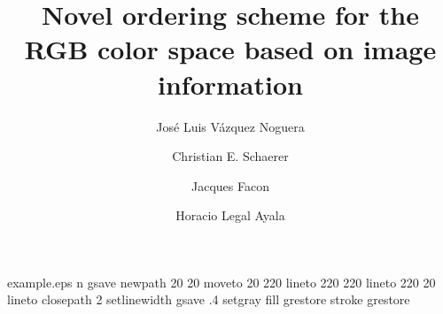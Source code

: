 %
%
%
%
%
\begin{filecontents*}{example.eps}
n%
gsave
newpath
  20 20 moveto
  20 220 lineto
  220 220 lineto
  220 20 lineto
closepath
2 setlinewidth
gsave
  .4 setgray fill
grestore
stroke
grestore
\end{filecontents*}
%
\documentclass[twocolumn,fleqn]{svjour3}
%
\smartqed  %
%
\usepackage[numbers]{natbib}
\usepackage{amssymb}
\usepackage{amsmath}
\usepackage{textcomp}
\usepackage[T1]{fontenc}
\usepackage[utf8]{inputenc}
\usepackage[spanish, english]{babel}
\usepackage{csquotes}
\usepackage{enumerate}
\usepackage{enumitem}
\usepackage{caption}
\captionsetup{compatibility=false}
\usepackage{subcaption}
\usepackage{listings}
\usepackage{array} %
\usepackage{multirow} %
\usepackage{nicefrac} %
\usepackage[dvipsnames]{xcolor}
\usepackage{pgfplots}
\pgfplotsset{compat=default}
\usepackage{pgfplotstable}
\usetikzlibrary{spy}
\usepackage{longtable}
\usepackage{array}
\usepackage{pdflscape}
\usepackage{booktabs}
\usepackage{graphicx} %



%
%
%
%
\journalname{}




\title{Novel ordering scheme for the RGB color space based on image information}
\author{
  Jos\'e Luis V\'azquez Noguera \and
  Christian E. Schaerer \and
  Jacques Facon	\and
  Horacio Legal Ayala
}

